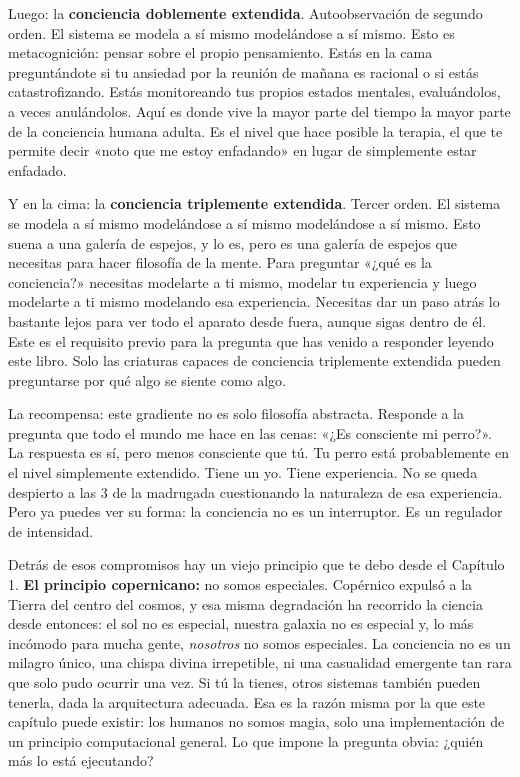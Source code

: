 \documentclass[11pt, twoside, openright]{book}
\begin{document}
Luego: la \textbf{conciencia doblemente extendida}. Autoobservación de segundo orden. El sistema se modela a sí mismo modelándose a sí mismo. Esto es metacognición: pensar sobre el propio pensamiento. Estás en la cama preguntándote si tu ansiedad por la reunión de mañana es racional o si estás catastrofizando. Estás monitoreando tus propios estados mentales, evaluándolos, a veces anulándolos. Aquí es donde vive la mayor parte del tiempo la mayor parte de la conciencia humana adulta. Es el nivel que hace posible la terapia, el que te permite decir «noto que me estoy enfadando» en lugar de simplemente estar enfadado.

Y en la cima: la \textbf{conciencia triplemente extendida}. Tercer orden. El sistema se modela a sí mismo modelándose a sí mismo modelándose a sí mismo. Esto suena a una galería de espejos, y lo es, pero es una galería de espejos que necesitas para hacer filosofía de la mente. Para preguntar «¿qué es la conciencia?» necesitas modelarte a ti mismo, modelar tu experiencia y luego modelarte a ti mismo modelando esa experiencia. Necesitas dar un paso atrás lo bastante lejos para ver todo el aparato desde fuera, aunque sigas dentro de él. Este es el requisito previo para la pregunta que has venido a responder leyendo este libro. Solo las criaturas capaces de conciencia triplemente extendida pueden preguntarse por qué algo se siente como algo.

La recompensa: este gradiente no es solo filosofía abstracta. Responde a la pregunta que todo el mundo me hace en las cenas: «¿Es consciente mi perro?». La respuesta es sí, pero menos consciente que tú. Tu perro está probablemente en el nivel simplemente extendido. Tiene un yo. Tiene experiencia. No se queda despierto a las 3 de la madrugada cuestionando la naturaleza de esa experiencia. Pero ya puedes ver su forma: la conciencia no es un interruptor. Es un regulador de intensidad.

Detrás de esos compromisos hay un viejo principio que te debo desde el Capítulo 1. \textbf{El principio copernicano:} no somos especiales. Copérnico expulsó a la Tierra del centro del cosmos, y esa misma degradación ha recorrido la ciencia desde entonces: el sol no es especial, nuestra galaxia no es especial y, lo más incómodo para mucha gente, \textit{nosotros} no somos especiales. La conciencia no es un milagro único, una chispa divina irrepetible, ni una casualidad emergente tan rara que solo pudo ocurrir una vez. Si tú la tienes, otros sistemas también pueden tenerla, dada la arquitectura adecuada. Esa es la razón misma por la que este capítulo puede existir: los humanos no somos magia, solo una implementación de un principio computacional general. Lo que impone la pregunta obvia: ¿quién más lo está ejecutando?
\end{document}
